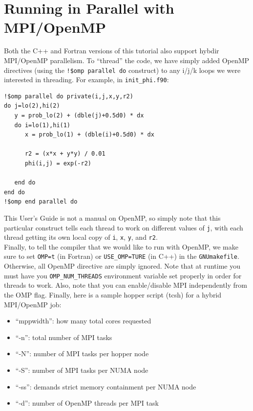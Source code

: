 \section{Running in Parallel with MPI/OpenMP}\label{Sec:OpenMP}
Both the C++ and Fortran versions of this tutorial also support hybdir MPI/OpenMP parallelism.
To ``thread'' the code, we have simply added OpenMP directives (using the {\tt !\$omp parallel do} 
construct) to any i/j/k loops we were interested in threading.  For example, in {\tt init\_phi.f90}:
\begin{lstlisting}[backgroundcolor=\color{light-green}]
!$omp parallel do private(i,j,x,y,r2)
do j=lo(2),hi(2)
   y = prob_lo(2) + (dble(j)+0.5d0) * dx
   do i=lo(1),hi(1)
      x = prob_lo(1) + (dble(i)+0.5d0) * dx

      r2 = (x*x + y*y) / 0.01
      phi(i,j) = exp(-r2)

   end do
end do
!$omp end parallel do
\end{lstlisting}
This User's Guide is not a manual on OpenMP, so simply note that this particular 
construct tells each thread to work on different values of {\tt j}, with each 
thread getting its own local copy of {\tt i}, {\tt x}, {\tt y}, and {\tt r2}.\\

Finally, to tell the compiler that we would like to run with OpenMP, we make sure to
set {\tt OMP=t} (in Fortran) or {\tt USE\_OMP=TURE} (in C++) in the {\tt GNUmakefile}.
Otherwise, all OpenMP directive are
simply ignored.  Note that at runtime you must have you 
{\tt OMP\_NUM\_THREADS} environment variable set properly in order for threads to work.
Also, note that you can enable/disable MPI independently from the OMP flag.  Finally,
here is a sample hopper script (tcsh) for a hybrid MPI/OpenMP job:

\begin{itemize}
\item ``mppwidth'': how many total cores requested
\item ``-n'': total number of MPI tasks
\item ``-N'': number of MPI tasks per hopper node
\item ``-S'': number of MPI tasks per NUMA node
\item ``-ss'': demands strict memory containment per NUMA node
\item ``-d'': number of OpenMP threads per MPI task
\end{itemize}
